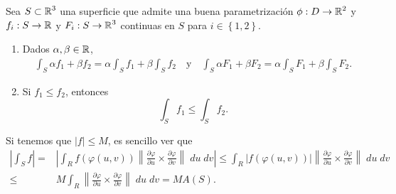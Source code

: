 \begin{prop}
	Sea $\displaystyle S \subset \mathbb{R}^{3} $ una superficie que admite una buena parametrización $\displaystyle \phi: D \to \mathbb{R}^{2} $ y $\displaystyle f_{i} : S \to \mathbb{R} $ y $\displaystyle F_{i} : S \to \mathbb{R}^{3} $ continuas en $\displaystyle S $ para $\displaystyle i \in \left\{ 1,2\right\}  $. 
\begin{enumerate}
\item Dados $\displaystyle \alpha, \beta \in \mathbb{R} $,  
	\[
	\begin{split}
	\int _{S}\alpha f_{1} + \beta f_{2} = \alpha \int _{S}f_{1} +\beta \int _{S}f_{2} \quad \text{y} \quad \int _{S}\alpha F_{1}+\beta F_{2} =\alpha \int _{S}F_{1} +\beta \int _{S}F_{2} .
	\end{split}
	\]
\item Si $\displaystyle f_{1}\leq f_{2} $, entonces
	\[\int _{S}f_{1} \leq \int _{S}f_{2} .\]
\end{enumerate}
\end{prop}
 
\begin{observation}
Si tenemos que $\displaystyle \left|f\right|\leq M $, es sencillo ver que
\[
\begin{split}
	\left|\int _{S}f \right|= &  \left|\int _{R}f\left(\varphi\left(u,v\right)\right)\left\|\frac{\partial \varphi}{\partial u} \times \frac{\partial \varphi}{\partial v}\right\| \; du \; dv\right| \leq \int _{R} \left|f\left(\varphi\left(u,v\right)\right)\right| \left\|\frac{\partial \varphi}{\partial u} \times \frac{\partial \varphi}{\partial v}\right\|\; du \; dv \\
	\leq & M \int _{R} \left\|\frac{\partial \varphi}{\partial u} \times \frac{\partial \varphi}{\partial v}\right\| \; du \; dv = M A\left(S\right).
\end{split}
\]
\end{observation}
